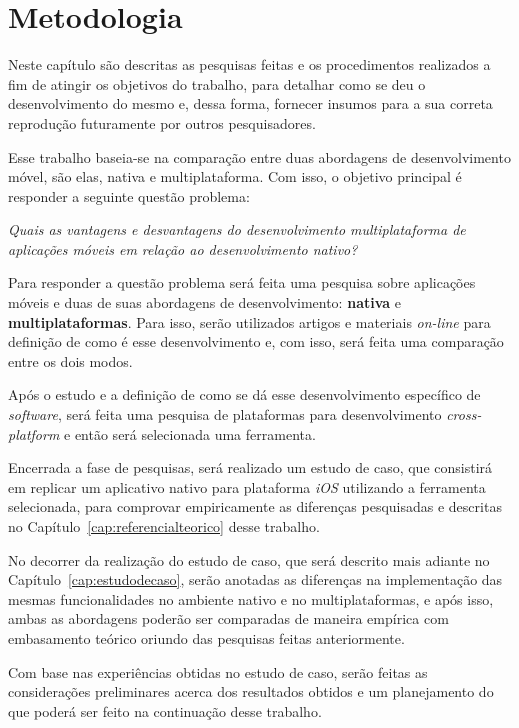 \chapter{Metodologia} \label{cap:metodologia}
Neste capítulo são descritas as pesquisas feitas e os procedimentos realizados a 
fim de atingir os objetivos do trabalho, para detalhar como se deu o desenvolvimento do mesmo e, 
dessa forma, fornecer insumos para a sua correta reprodução futuramente por outros pesquisadores.

Esse trabalho baseia-se na comparação entre duas abordagens de desenvolvimento móvel, são elas, nativa e multiplataforma. 
Com isso, o objetivo principal é responder a seguinte questão problema:
\begin{center}
    \textit{Quais as vantagens e desvantagens do desenvolvimento multiplataforma de aplicações móveis em relação ao desenvolvimento nativo?}
\end{center}

Para responder a questão problema será feita uma pesquisa sobre aplicações móveis e duas de suas abordagens de desenvolvimento: \textbf{nativa} e \textbf{multiplataformas}.
Para isso, serão utilizados artigos e materiais \textit{on-line} para definição de como é esse desenvolvimento e, com isso, será feita uma comparação entre os dois modos. 

Após o estudo e a definição de como se dá esse desenvolvimento específico de \textit{software},
será feita uma pesquisa de plataformas para desenvolvimento \textit{cross-platform} e então será selecionada uma ferramenta.%

Encerrada a fase de pesquisas, será realizado um estudo de caso, que consistirá em replicar um aplicativo nativo para plataforma \textit{iOS} utilizando a ferramenta selecionada, 
para comprovar empiricamente as diferenças pesquisadas e descritas no Capítulo~\ref{cap:referencialteorico} desse trabalho.

No decorrer da realização do estudo de caso, que será descrito mais adiante no 
Capítulo~\ref{cap:estudodecaso}, serão anotadas as diferenças na implementação das mesmas funcionalidades no ambiente nativo e no multiplataformas, e após isso, ambas as abordagens poderão ser comparadas
de maneira empírica com embasamento teórico oriundo das pesquisas feitas anteriormente.

Com base nas experiências obtidas no estudo de caso, serão feitas as considerações preliminares acerca dos resultados obtidos e um planejamento do que poderá ser feito na continuação desse trabalho.

